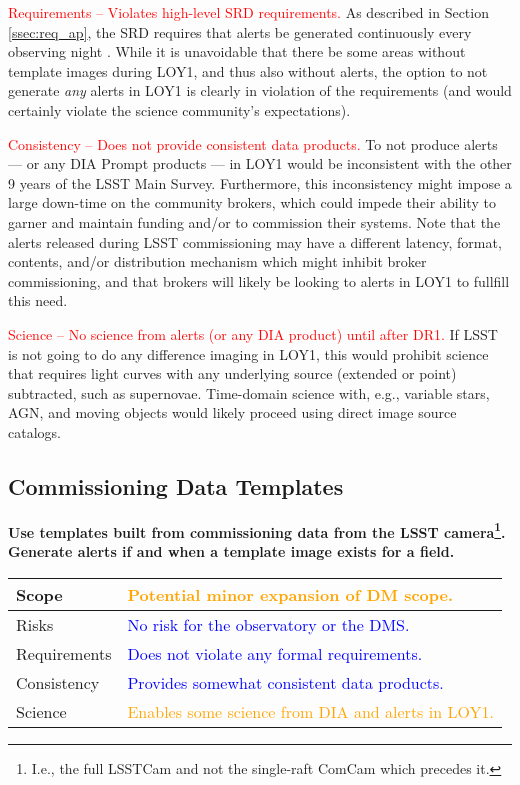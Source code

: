 \documentclass[DM,lsstdraft,toc]{lsstdoc}
\begin{document}
\textcolor{red}{ Requirements -- Violates high-level SRD requirements.} As described in Section \ref{ssec:req_ap}, the SRD requires that alerts be generated continuously every observing night . While it is unavoidable that there be some areas without template images during LOY1, and thus also without alerts, the option to not generate {\it any} alerts in LOY1 is clearly in violation of the requirements (and would certainly violate the science community's expectations).

\textcolor{red}{ Consistency -- Does not provide consistent data products.} To not produce alerts --- or any DIA Prompt products --- in LOY1 would be inconsistent with the other 9 years of the LSST Main Survey. Furthermore, this inconsistency might impose a large down-time on the community brokers, which could impede their ability to garner and maintain funding and/or to commission their systems. Note that the alerts released during LSST commissioning may have a different latency, format, contents, and/or distribution mechanism which might inhibit broker commissioning, and that brokers will likely be looking to alerts in LOY1 to fullfill this need.

\textcolor{red}{ Science -- No science from alerts (or any DIA product) until after DR1.} If LSST is not going to do any difference imaging in LOY1, this would prohibit science that requires light curves with any underlying source (extended or point) subtracted, such as supernovae. Time-domain science with, e.g., variable stars, AGN, and moving objects would likely proceed using direct image source catalogs. 

\clearpage
\subsection{Commissioning Data Templates}\label{ssec:potsol_comm}

{\bf Use templates built from commissioning data from the LSST camera\footnote{I.e., the full LSSTCam and not the single-raft ComCam which precedes it.}. Generate alerts if and when a template image exists for a field.}

\begin{center}
\begin{tabular}{|p{2.5cm}|p{13cm}|}
\hline
Scope & \textcolor{orange}{Potential minor expansion of DM scope.}   \\
\hline
Risks & \textcolor{blue}{No risk for the observatory or the DMS.} \\
\hline
Requirements & \textcolor{blue}{Does not violate any formal requirements.} \\
\hline
Consistency & \textcolor{blue}{Provides somewhat consistent data products.}  \\
\hline
Science & \textcolor{orange}{Enables some science from DIA and alerts in LOY1.} \\
\hline
\end{tabular}
\end{center}
\end{document}
